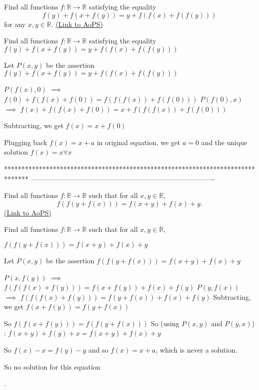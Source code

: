 \begin{problem}
	Find all functions $f: \mathbb{R}\to\mathbb{R}$ satisfying the equality 
\[f(y)+f(x+f(y))=y+f(f(x)+f(f(y)))\]
for any $x, y \in \mathbb R$.
	\flushright \href{https://artofproblemsolving.com/community/c6h438121}{(Link to AoPS)}
\end{problem}



\begin{solution}
	\begin{tcolorbox}Find all functions $f: \mathbb{R}\to\mathbb{R}$ satisfying the equality 
$f(y)+f(x+f(y))=y+f(f(x)+f(f(y)))$\end{tcolorbox}
Let $P(x,y)$ be the assertion $f(y)+f(x+f(y))=y+f(f(x)+f(f(y)))$

$P(f(x),0)$ $\implies$ $f(0)+f(f(x)+f(0))=f(f(f(x))+f(f(0)))$
$P(f(0),x)$ $\implies$ $f(x)+f(f(x)+f(0))=x+f(f(f(x))+f(f(0)))$

Subtracting, we get $f(x)=x+f(0)$

Plugging back $f(x)=x+a$ in original equation, we get $a=0$ and the unique solution $\boxed{f(x)=x\forall x}$
\end{solution}
*******************************************************************************
-------------------------------------------------------------------------------

\begin{problem}
	Find all functions $f:\mathbb{R}\rightarrow\mathbb{R}$ such that for all $x,y\in\mathbb R$,
\[f(f(y+f(x))) = f(x+y) + f(x)+y.\]
	\flushright \href{https://artofproblemsolving.com/community/c6h438139}{(Link to AoPS)}
\end{problem}



\begin{solution}
	\begin{tcolorbox}Find all functions $f:\mathbb{R}\rightarrow\mathbb{R}$ such that for all $x,y\in\mathbb R$,

$f(f(y+f(x))) = f(x+y) + f(x)+y$\end{tcolorbox}
Let $P(x,y)$ be the assertion $f(f(y+f(x)))=f(x+y)+f(x)+y$

$P(x,f(y))$ $\implies$ $f(f(f(x)+f(y)))=f(x+f(y))+f(x)+f(y)$
$P(y,f(x))$ $\implies$ $f(f(f(x)+f(y)))=f(y+f(x))+f(x)+f(y)$
Subtracting, we get $f(x+f(y))=f(y+f(x))$

So $f(f(x+f(y)))=f(f(y+f(x)))$
So (using $P(x,y)$ and $P(y,x)$) : $f(x+y)+f(y)+x=f(x+y)+f(x)+y$

So $f(x)-x=f(y)-y$ and so $f(x)=x+a$, which is never a solution.

\begin{bolded}So no solution for this equation\end{bolded}.
\end{solution}



